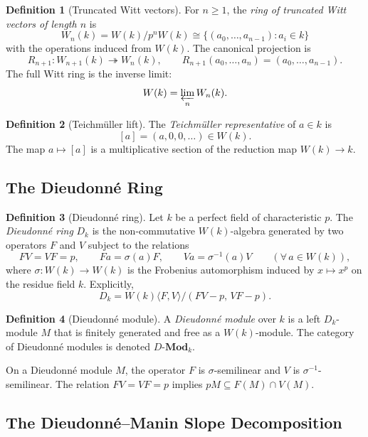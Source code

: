\documentclass[12pt]{article}
\theoremstyle{definition}
\newtheorem{definition}{Definition}[section]
\theoremstyle{plain}
\theoremstyle{remark}
\newcommand{\cD}{D\text{-}\mathbf{Mod}}
\newcommand{\Dk}{D_k}
\begin{document}
\begin{definition}[Truncated Witt vectors]
For $n\geq 1$, the \emph{ring of truncated Witt vectors of length $n$} is
\[
W_n(k)=W(k)/p^nW(k)\cong\{(a_0,\dots,a_{n-1}):a_i\in k\}
\]
with the operations induced from $W(k)$. The canonical projection is
\[
R_{n+1}:W_{n+1}(k)\twoheadrightarrow W_n(k),\qquad
R_{n+1}(a_0,\dots,a_n)=(a_0,\dots,a_{n-1}).
\]
The full Witt ring is the inverse limit:
\[
W(k)=\varprojlim_{n}W_n(k).
\]
\end{definition}

\begin{definition}[Teichm\"{u}ller lift]
The \emph{Teichm\"{u}ller representative} of $a\in k$ is
\[
[a]=(a,0,0,\dots)\in W(k).
\]
The map $a\mapsto[a]$ is a multiplicative section of the reduction map $W(k)\to k$.
\end{definition}

\subsection{The Dieudonn\'{e} Ring}

\begin{definition}[Dieudonn\'{e} ring]
Let $k$ be a perfect field of characteristic $p$. The \emph{Dieudonn\'{e} ring} $\Dk$ is the non-commutative $W(k)$-algebra generated by two operators $F$ and $V$ subject to the relations
\[
FV=VF=p,\qquad
Fa=\sigma(a)F,\qquad
Va=\sigma^{-1}(a)V\qquad(\forall\,a\in W(k)),
\]
where $\sigma:W(k)\to W(k)$ is the Frobenius automorphism induced by $x\mapsto x^p$ on the residue field $k$. Explicitly,
\[
\Dk=W(k)\langle F,V\rangle/(FV-p,\,VF-p).
\]
\end{definition}

\begin{definition}[Dieudonn\'{e} module]
A \emph{Dieudonn\'{e} module} over $k$ is a left $\Dk$-module $M$ that is finitely generated and free as a $W(k)$-module. The category of Dieudonn\'{e} modules is denoted $\cD_k$.
\end{definition}

On a Dieudonn\'{e} module $M$, the operator $F$ is $\sigma$-semilinear and $V$ is $\sigma^{-1}$-semilinear. The relation $FV=VF=p$ implies $pM\subseteq F(M)\cap V(M)$.

\subsection{The Dieudonn\'{e}--Manin Slope Decomposition}
\end{document}
